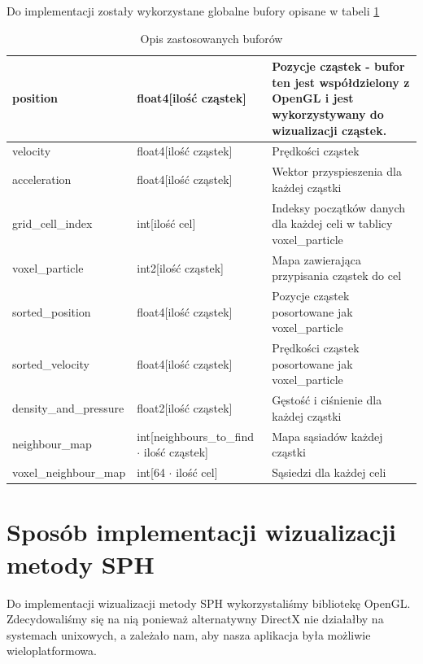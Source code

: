 \documentclass[polish, 12pt]{aghthesis}
\begin{document}
			Do implementacji zostały wykorzystane globalne bufory opisane w tabeli \ref{tab:buf}

			\begin{table}[h!]
			\begin{tabular}{| p{} | p{} | p{} |}

				\hline
					position & float4[ilość cząstek] & Pozycje cząstek - bufor ten jest współdzielony z OpenGL i jest wykorzystywany do wizualizacji cząstek. \\
				\hline
					velocity & float4[ilość cząstek] & Prędkości cząstek \\
				\hline
					acceleration & float4[ilość cząstek] & Wektor przyspieszenia dla każdej cząstki\\
				\hline
					grid\_cell\_index & int[ilość cel] & Indeksy początków danych dla każdej celi w tablicy voxel\_particle \\
				\hline
					voxel\_particle & int2[ilość cząstek] & Mapa zawierająca przypisania cząstek do cel \\ 
				\hline
					sorted\_position & float4[ilość cząstek] & Pozycje cząstek posortowane jak voxel\_particle\\
				\hline
					sorted\_velocity & float4[ilość cząstek] & Prędkości cząstek posortowane jak voxel\_particle\\
				\hline
					density\_and\_pressure & float2[ilość cząstek] & Gęstość i ciśnienie dla każdej cząstki\\
				\hline
					neighbour\_map & int[neighbours\_to\_find ${\cdot}$ ilość cząstek] & Mapa sąsiadów każdej cząstki\\
				\hline
					voxel\_neighbour\_map & int[64 ${\cdot}$ ilość cel] & Sąsiedzi dla każdej celi \\
				\hline
			
			\end{tabular}
			\caption{Opis zastosowanych buforów}
			\label{tab:buf}
			\end{table}
			

\section{Sposób implementacji wizualizacji metody SPH}

	Do implementacji wizualizacji metody SPH wykorzystaliśmy bibliotekę OpenGL. Zdecydowaliśmy się na nią ponieważ alternatywny DirectX nie działałby na systemach unixowych, a zależało nam, aby nasza aplikacja była możliwie wieloplatformowa.
	
\end{document}
